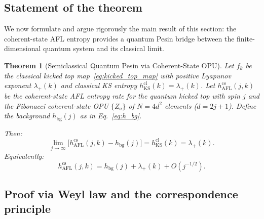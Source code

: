 \documentclass[12pt,a4paper]{article}
\newtheorem{theorem}{Theorem}[section]
\begin{document}
\subsection{Statement of the theorem}

We now formulate and argue rigorously the main result of this section:
the coherent-state AFL entropy provides a quantum Pesin bridge between
the finite-dimensional quantum system and its classical limit.

\begin{theorem}[Semiclassical Quantum Pesin via Coherent-State OPU]
  \label{thm:semiclassical_pesin}
  Let $f_k$ be the classical kicked top map~\eqref{eq:kicked_top_map}
  with positive Lyapunov exponent $\lambda_+(k)$ and classical KS entropy
  $h_{\mathrm{KS}}^{\mathrm{cl}}(k) = \lambda_+(k)$.
  Let $h_{\mathrm{AFL}}^{\mathrm{cs}}(j,k)$ be the coherent-state AFL
  entropy rate for the quantum kicked top with spin $j$ and the Fibonacci
  coherent-state OPU $\{Z_a\}$ of $N = 4d^2$ elements ($d = 2j+1$).
  Define the background $h_{\mathrm{bg}}(j)$ as in Eq.~\eqref{eq:h_bg}.

  Then:
  \begin{equation}
    \label{eq:semiclassical_pesin}
    \lim_{j\to\infty}
    \bigl[h_{\mathrm{AFL}}^{\mathrm{cs}}(j,k) - h_{\mathrm{bg}}(j)\bigr]
    = h_{\mathrm{KS}}^{\mathrm{cl}}(k)
    = \lambda_+(k).
  \end{equation}
  Equivalently:
  \[
    h_{\mathrm{AFL}}^{\mathrm{cs}}(j,k)
    = h_{\mathrm{bg}}(j) + \lambda_+(k) + O(j^{-1/2}).
  \]
\end{theorem}

\subsection{Proof via Weyl law and the correspondence principle}
\end{document}
